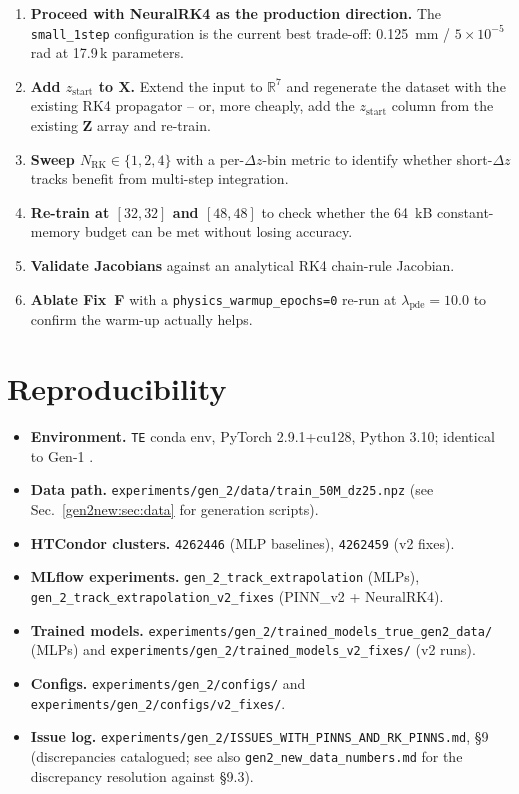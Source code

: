 \documentclass[a4paper,11pt]{article}
\newcommand{\SI}[2]{#1~#2}
\newcommand{\dz}{\Delta z}
\begin{document}
\begin{enumerate}
\item \textbf{Proceed with NeuralRK4 as the production direction.}
  The \texttt{small\_1step} configuration is the current best
  trade-off: \SI{0.125}{mm} / $5\!\times\!10^{-5}$\,rad at 17.9\,k
  parameters.
\item \textbf{Add $z_{\mathrm{start}}$ to $\mathbf{X}$.} Extend the
  input to $\mathbb{R}^7$ and regenerate the dataset with the
  existing RK4 propagator -- or, more cheaply, add the
  $z_{\mathrm{start}}$ column from the existing $\mathbf{Z}$ array
  and re-train.
\item \textbf{Sweep $N_{\mathrm{RK}}\in\{1,2,4\}$} with a
  per-$\dz$-bin metric to identify whether short-$\dz$ tracks benefit
  from multi-step integration.
\item \textbf{Re-train at $[32,32]$ and $[48,48]$} to check whether
  the \SI{64}{kB} constant-memory budget can be met without losing
  accuracy.
\item \textbf{Validate Jacobians} against an analytical RK4
  chain-rule Jacobian.
\item \textbf{Ablate Fix~F} with a
  \texttt{physics\_warmup\_epochs=0} re-run at
  $\lambda_{\mathrm{pde}}=10.0$ to confirm the warm-up actually
  helps.
\end{enumerate}

\section{Reproducibility}\label{gen2new:sec:repro}

\begin{itemize}
\item \textbf{Environment.} \texttt{TE} conda env, PyTorch 2.9.1+cu128,
  Python 3.10; identical to Gen-1 \cite{gen1report}.
\item \textbf{Data path.} \texttt{experiments/gen\_2/data/train\_50M\_dz25.npz}
  (see Sec.~\ref{gen2new:sec:data} for generation scripts).
\item \textbf{HTCondor clusters.} \texttt{4262446} (MLP baselines),
  \texttt{4262459} (v2 fixes).
\item \textbf{MLflow experiments.} \texttt{gen\_2\_track\_extrapolation}
  (MLPs), \texttt{gen\_2\_track\_extrapolation\_v2\_fixes} (PINN\_v2 +
  NeuralRK4).
\item \textbf{Trained models.}
  \texttt{experiments/gen\_2/trained\_models\_true\_gen2\_data/}
  (MLPs) and
  \texttt{experiments/gen\_2/trained\_models\_v2\_fixes/}
  (v2 runs).
\item \textbf{Configs.} \texttt{experiments/gen\_2/configs/} and
  \texttt{experiments/gen\_2/configs/v2\_fixes/}.
\item \textbf{Issue log.}
  \texttt{experiments/gen\_2/ISSUES\_WITH\_PINNS\_AND\_RK\_PINNS.md},
  \S9 (discrepancies catalogued; see also
  \texttt{gen2\_new\_data\_numbers.md} for the discrepancy resolution
  against \S9.3).
\end{itemize}
\end{document}
